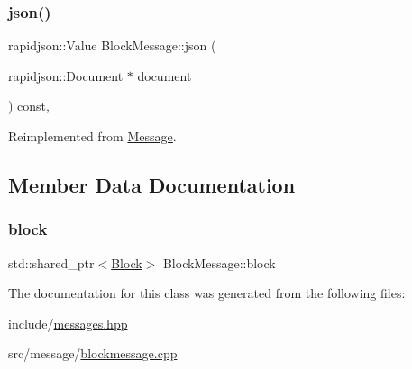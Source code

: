 \subsubsection{\texorpdfstring{json()}{json()}}
{\footnotesize\ttfamily rapidjson\+::\+Value Block\+Message\+::json (\begin{DoxyParamCaption}\item[{rapidjson\+::\+Document $\ast$}]{document }\end{DoxyParamCaption}) const\hspace{0.3cm}{\ttfamily [override]}, {\ttfamily [virtual]}}



Reimplemented from \mbox{\hyperlink{classMessage_a6f8e3ac2eed3a8afe9400fcd5b3447b2}{Message}}.



\subsection{Member Data Documentation}
\mbox{\label{classBlockMessage_a546ae4b4e006de9e2776f4f2a40f3b9d}} 
\subsubsection{\texorpdfstring{block}{block}}
{\footnotesize\ttfamily std\+::shared\+\_\+ptr$<$\mbox{\hyperlink{classBlock}{Block}}$>$ Block\+Message\+::block\hspace{0.3cm}{\ttfamily [private]}}



The documentation for this class was generated from the following files\+:\begin{DoxyCompactItemize}
\item 
include/\mbox{\hyperlink{messages_8hpp}{messages.\+hpp}}\item 
src/message/\mbox{\hyperlink{blockmessage_8cpp}{blockmessage.\+cpp}}\end{DoxyCompactItemize}
